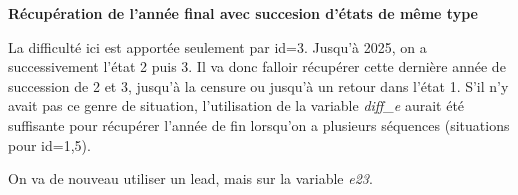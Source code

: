 \documentclass[
  12pt,
  letterpaper,
  DIV=11,
  numbers=noendperiod,
  onepage,
  openany]{scrreprt}
\newenvironment{Shaded}{\begin{snugshade}}{\end{snugshade}}
\newcommand{\AttributeTok}[1]{\textcolor[rgb]{0.80,0.80,0.80}{#1}}
\newcommand{\ConstantTok}[1]{\textcolor[rgb]{0.86,0.64,0.64}{\textbf{#1}}}
\newcommand{\DecValTok}[1]{\textcolor[rgb]{0.86,0.86,0.80}{#1}}
\newcommand{\FunctionTok}[1]{\textcolor[rgb]{0.94,0.94,0.56}{#1}}
\newcommand{\NormalTok}[1]{\textcolor[rgb]{0.80,0.80,0.80}{#1}}
\newcommand{\OtherTok}[1]{\textcolor[rgb]{0.94,0.94,0.56}{#1}}
\newcommand{\SpecialCharTok}[1]{\textcolor[rgb]{0.86,0.64,0.64}{#1}}
\newcommand*\circled[1]{\tikz[baseline=(char.base)]{
          \node[shape=circle,draw,inner sep=1pt] (char) {{\scriptsize#1}};}}
\begin{document}
\textbf{Récupération de l'année final avec succesion d'états de même
type}

La difficulté ici est apportée seulement par id=3. Jusqu'à 2025, on a
successivement l'état 2 puis 3. Il va donc falloir récupérer cette
dernière année de succession de 2 et 3, jusqu'à la censure ou jusqu'à un
retour dans l'état 1. S'il n'y avait pas ce genre de situation,
l'utilisation de la variable \emph{diff\_e} aurait été suffisante pour
récupérer l'année de fin lorsqu'on a plusieurs séquences (situations
pour id=1,5).

On va de nouveau utiliser un lead, mais sur la variable \emph{e23}.

\hypertarget{annotated-cell-55}{%
\label{annotated-cell-55}}%
\begin{Shaded}
\end{Shaded}
\end{document}
